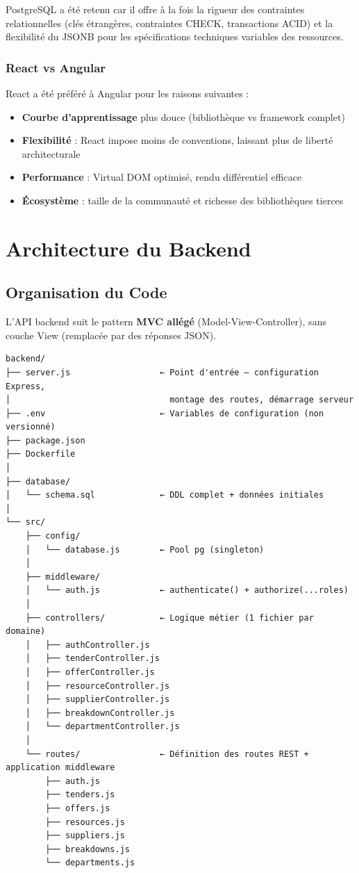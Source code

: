 \documentclass[12pt,a4paper]{report}
\begin{document}
PostgreSQL a été retenu car il offre à la fois la rigueur des contraintes relationnelles (clés étrangères, contraintes CHECK, transactions ACID) et la flexibilité du JSONB pour les spécifications techniques variables des ressources.

\subsection{React vs Angular}

React a été préféré à Angular pour les raisons suivantes :
\begin{itemize}[leftmargin=1.5cm]
    \item \textbf{Courbe d'apprentissage} plus douce (bibliothèque vs framework complet)
    \item \textbf{Flexibilité} : React impose moins de conventions, laissant plus de liberté architecturale
    \item \textbf{Performance} : Virtual DOM optimisé, rendu différentiel efficace
    \item \textbf{Écosystème} : taille de la communauté et richesse des bibliothèques tierces
\end{itemize}

\chapter{Architecture du Backend}

\section{Organisation du Code}

L'API backend suit le pattern \textbf{MVC allégé} (Model-View-Controller), sans couche View (remplacée par des réponses JSON).

\begin{center}
\begin{verbatim}
backend/
├── server.js                  ← Point d'entrée — configuration Express,
│                                montage des routes, démarrage serveur
├── .env                       ← Variables de configuration (non versionné)
├── package.json
├── Dockerfile
│
├── database/
│   └── schema.sql             ← DDL complet + données initiales
│
└── src/
    ├── config/
    │   └── database.js        ← Pool pg (singleton)
    │
    ├── middleware/
    │   └── auth.js            ← authenticate() + authorize(...roles)
    │
    ├── controllers/           ← Logique métier (1 fichier par domaine)
    │   ├── authController.js
    │   ├── tenderController.js
    │   ├── offerController.js
    │   ├── resourceController.js
    │   ├── supplierController.js
    │   ├── breakdownController.js
    │   └── departmentController.js
    │
    └── routes/                ← Définition des routes REST + application middleware
        ├── auth.js
        ├── tenders.js
        ├── offers.js
        ├── resources.js
        ├── suppliers.js
        ├── breakdowns.js
        └── departments.js
\end{verbatim}
\end{center}
\end{document}
